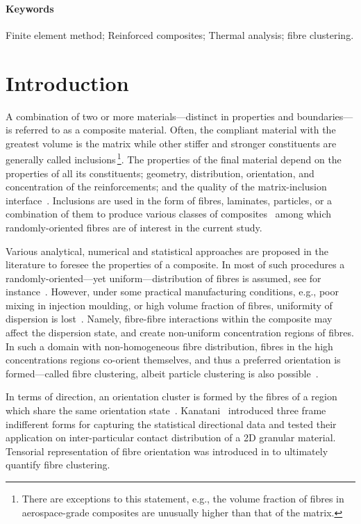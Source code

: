 \paragraph{Keywords} Finite element method; Reinforced composites; Thermal analysis; fibre clustering.

\section{Introduction}
	A combination of two or more materials---distinct in properties and boundaries---is referred to as a composite material. Often, the compliant material with the greatest volume is the matrix while other stiffer and stronger constituents are generally called inclusions\,\footnote{There are exceptions to this statement, e.g., the volume fraction of fibres in aerospace-grade composites are unusually higher than that of the matrix.}. The properties of the final material depend on the properties of all its constituents; geometry, distribution, orientation, and concentration of the reinforcements; and the quality of the matrix-inclusion interface~\autocite{Altenbach.2010}. Inclusions are used in the form of fibres, laminates, particles, or a combination of them to produce various classes of composites~\autocite{Jones.1999} among which randomly-oriented fibres are of interest in the current study.

	Various analytical, numerical and statistical approaches are proposed in the literature to foresee the properties of a composite. In most of such procedures a randomly-oriented---yet uniform---distribution of fibres is assumed, see for instance~\autocite{Lu.2014,Javanbakht.2016b,Javanbakht.2016}. However, under some practical manufacturing conditions, e.g., poor mixing in injection moulding, or high volume fraction of fibres, uniformity of dispersion is lost~\autocite{Kataoka.2000}. Namely, fibre-fibre interactions within the composite may affect the dispersion state, and create non-uniform concentration regions of fibres. In such a domain with non-homogeneous fibre distribution, fibres in the high concentrations regions co-orient themselves, and thus a preferred orientation is formed---called fibre clustering, albeit particle clustering is also possible~\autocite{Jack.2005,Tszeng.1998,Tewari.2004}.
	
	In terms of direction, an orientation cluster is formed by the fibres of a region which share the same orientation state~\autocite{Folgar.1984}. Kanatani~\autocite{Kanatani.1984} introduced three frame indifferent forms for capturing the statistical directional data and tested their application on inter-particular contact distribution of a 2D granular material. Tensorial representation of fibre orientation was introduced in \autocite{Advani.1987,Advani.1990} to ultimately quantify fibre clustering.
	
